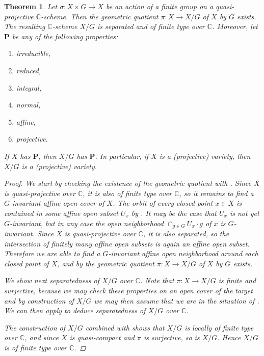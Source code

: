 \documentclass[12pt,a4paper]{amsart}
\theoremstyle{plain}
\newtheorem{thm}{Theorem}[section]
\theoremstyle{definition}
\theoremstyle{remark}
\begin{document}
\begin{thm}\label{thm:quotient}
  Let $\sigma \colon X \times G \to X$ be an action of a finite group on a quasi-projective $\mathbb{C}$-scheme.
  Then the geometric quotient $\pi \colon X \to X/G$ of $X$ by $G$ exists.
  The resulting $\mathbb{C}$-scheme $X/G$ is separated and of finite type over $\mathbb{C}$.
  Moreover, let $\mathbf{P}$ be any of the following properties:
  \begin{enumerate}[label=(\alph*)]
    \item irreducible,
    \item reduced,
    \item integral,
    \item normal,
    \item affine,
    \item projective.
  \end{enumerate}
  If $X$ has $\mathbf{P}$, then $X/G$ has $\mathbf{P}$.
  In particular, if $X$ is a (projective) variety, then $X/G$ is a (projective) variety.

  \begin{proof}
    We start by checking the existence of the geometric quotient with .
    Since $X$ is quasi-projective over $\mathbb{C}$, it is also of finite type over $\mathbb{C}$, so it remains to find a $G$-invariant affine open cover of $X$.
    The orbit of every closed point $x \in X$ is contained in some affine open subset $U_{x}$ by .
    It may be the case that $U_{x}$ is not yet $G$-invariant, but in any case the open neighborhood $\cap_{g \in G} U_{x}\cdot g$ of $x$ is $G$-invariant.
    Since $X$ is quasi-projective over $\mathbb{C}$, it is also separated, so the intersection of finitely many affine open subsets is again an affine open subset.
    Therefore we are able to find a $G$-invariant affine open neighborhood around each closed point of $X$, and by  the geometric quotient $\pi \colon X \to X/G$ of $X$ by $G$ exists.

    We show next separatedness of $X/G$ over $\mathbb{C}$.
    Note that $\pi \colon X \to X/G$ is finite and surjective, because we may check these properties on an open cover of the target and by construction of $X/G$ we may then assume that we are in the situation of .
    We can then apply \cite[\href{https://stacks.math.columbia.edu/tag/09MQ}{Tag 09MQ}]{stacks-project} to deduce separatedness of $X/G$ over $\mathbb{C}$.

    The construction of $X/G$ combined with  shows that $X/G$ is locally of finite type over $\mathbb{C}$, and since $X$ is quasi-compact and $\pi$ is surjective, so is $X/G$.
    Hence $X/G$ is of finite type over $\mathbb{C}$.
    

\end{proof}
\end{thm}
\end{document}
